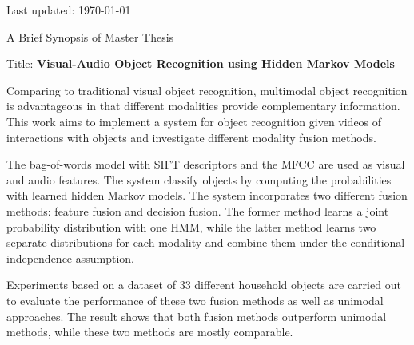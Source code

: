 \documentclass[a4paper,11pt]{article} %
\begin{document}
\vspace{.5cm}
\par{\centering \scriptsize Last updated: \today \par}

\newpage

\par{\centering \Large \hypertarget{synopsis}{A Brief Synopsis of Master Thesis}\par}

Title: \textbf{Visual-Audio Object Recognition using Hidden Markov Models}

Comparing to traditional visual object recognition, multimodal object recognition is advantageous in that different modalities provide complementary information. This work aims to implement a system for object recognition given videos of interactions with objects and investigate different modality fusion methods.

The bag-of-words model with SIFT descriptors and the MFCC are used as visual and audio features. The system classify objects by computing the probabilities with learned hidden Markov models. The system incorporates two different fusion methods: feature fusion and decision fusion. The former method learns a joint probability distribution with one HMM, while the latter method learns two separate distributions for each modality and combine them under the conditional independence assumption.

Experiments based on a dataset of 33 different household objects are carried out to evaluate the performance of these two fusion methods as well as unimodal approaches. The result shows that both fusion methods outperform unimodal methods, while these two methods are mostly comparable. 
 
\end{document}
